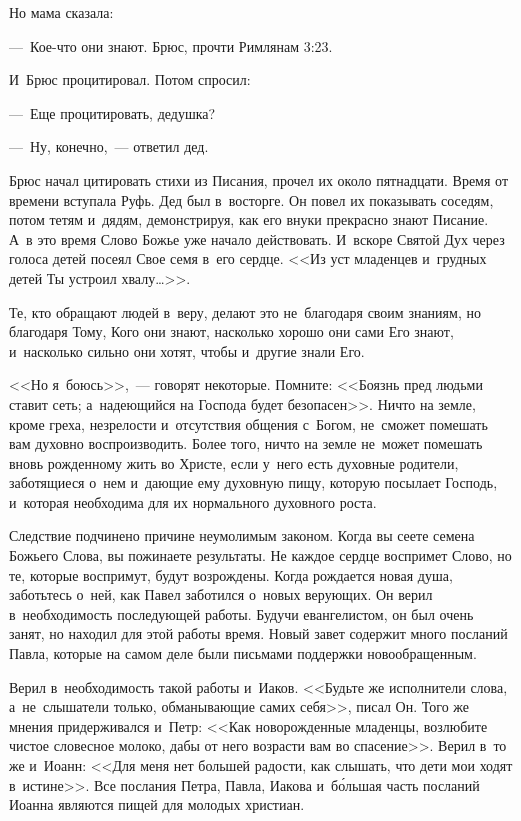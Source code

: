 \documentclass[12pt,article,a4paper,fittopage]{ncc}
\begin{document}
\begin{multicols}{2}
Но мама сказала:

---~Кое-что они знают. Брюс, прочти Римлянам 3:23.

И~Брюс процитировал. Потом спросил: 

---~Еще процитировать, дедушка?

---~Ну, конечно,~--- ответил дед.

Брюс начал цитировать стихи из Писания, прочел их около пятнадцати. Время от времени вступала Руфь. Дед был в~восторге. Он повел их показывать соседям, потом тетям и~дядям, демонстрируя, как его внуки прекрасно знают Писание. А~в это время Слово Божье уже начало действовать. И~вскоре Святой Дух через голоса детей посеял Свое семя в~его сердце. <<Из уст младенцев и~грудных детей Ты устроил хвалу\ldots{}>>.

Те, кто обращают людей в~веру, делают это не~благодаря своим знаниям, но благодаря Тому, Кого они знают, насколько хорошо они сами Его знают, и~насколько сильно они хотят, чтобы и~другие знали Его.

<<Но я~боюсь>>,~--- говорят некоторые. Помните: <<Боязнь пред людьми ставит сеть; а~надеющийся на Господа будет безопасен>>. Ничто на земле, кроме греха, незрелости и~отсутствия общения с~Богом, не~сможет помешать вам духовно воспроизводить. Более того, ничто на земле не~может помешать вновь рожденному жить во Христе, если у~него есть духовные родители, заботящиеся о~нем и~дающие ему духовную пищу, которую посылает Господь, и~которая необходима для их нормального духовного роста.

Следствие подчинено причине неумолимым законом. Когда вы сеете семена Божьего Слова, вы пожинаете результаты. Не каждое сердце воспримет Слово, но те, которые воспримут, будут возрождены. Когда рождается новая душа, заботьтесь о~ней, как Павел заботился о~новых верующих. Он верил в~необходимость последующей работы. Будучи евангелистом, он был очень занят, но находил для этой работы время. Новый завет содержит много посланий Павла, которые на самом деле были письмами поддержки новообращенным.

Верил в~необходимость такой работы и~Иаков. <<Будьте же исполнители слова, а~не~слышатели только, обманывающие самих себя>>, писал Он. Того же мнения придерживался и~Петр: <<Как новорожденные младенцы, возлюбите чистое словесное молоко, дабы от него возрасти вам во спасение>>. Верил в~то же и~Иоанн: <<Для меня нет большей радости, как слышать, что дети мои ходят в~истине>>. Все послания Петра, Павла, Иакова и~б\'{о}льшая часть посланий Иоанна являются пищей для молодых христиан.


\end{multicols}
\end{document}
